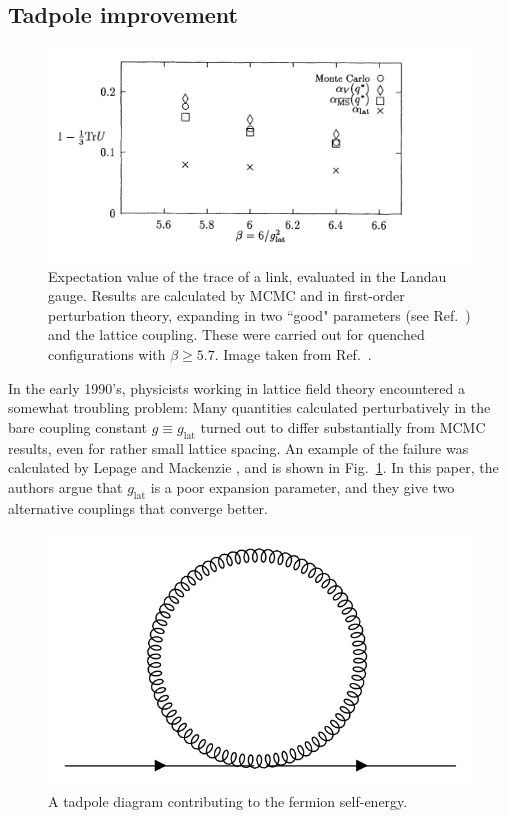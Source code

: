 \subsection{Tadpole improvement}

\begin{figure}
  \centering
  \includegraphics[width=\linewidth]{figs/averageLink.png}
  \caption{Expectation value of the trace of a link, evaluated in the
           Landau gauge. Results are calculated by MCMC and in first-order
           perturbation theory, expanding in two ``good" parameters
           (see Ref.~\cite{lepage_viability_1993}) and the lattice
           coupling. These were carried out for quenched configurations
           with $\beta\geq5.7$. Image taken from 
           Ref.~\cite{lepage_viability_1993}.}
  \label{fig:averageLink}
\end{figure}

In the early 1990's, physicists working in lattice field theory encountered
a somewhat troubling problem: Many quantities calculated perturbatively
in the bare coupling constant $g\equiv g_\text{lat}$ turned out to differ
substantially from MCMC results, even for rather small lattice spacing.
An example of the failure was calculated by Lepage and Mackenzie
\cite{lepage_viability_1993}, and is shown in Fig.~\ref{fig:averageLink}.
In this paper, the authors argue that $g_\text{lat}$ is a poor expansion
parameter, and they give two alternative couplings that converge better.

\begin{figure}
  \centering
  \includegraphics[width=0.5\linewidth]{figs/tadpole.png}
  \caption{A tadpole diagram contributing to the fermion self-energy.}
  \label{fig:tadpole}
\end{figure}

